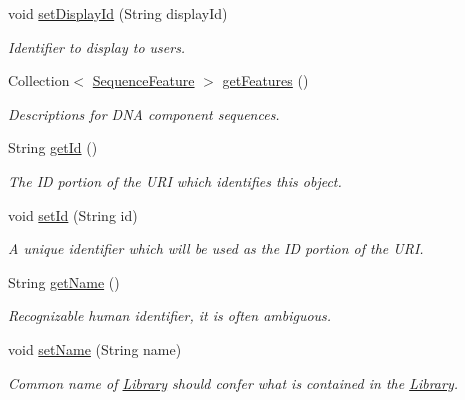 \begin{DoxyCompactItemize}
void \hyperlink{classorg_1_1sbolstandard_1_1lib_s_b_o_lj_1_1_library_a46b93a70e7bd612a7b429aac4829bc88}{setDisplayId} (String displayId)
\begin{DoxyCompactList}\small\item\em Identifier to display to users. \item\end{DoxyCompactList}\item 
Collection$<$ \hyperlink{classorg_1_1sbolstandard_1_1lib_s_b_o_lj_1_1_sequence_feature}{SequenceFeature} $>$ \hyperlink{classorg_1_1sbolstandard_1_1lib_s_b_o_lj_1_1_library_a6e4112a6cec45766efb5ce852f1e764e}{getFeatures} ()
\begin{DoxyCompactList}\small\item\em Descriptions for DNA component sequences. \item\end{DoxyCompactList}\item 
String \hyperlink{classorg_1_1sbolstandard_1_1lib_s_b_o_lj_1_1_library_aab219518f0eaf3db55b6a62ad6b49407}{getId} ()
\begin{DoxyCompactList}\small\item\em The ID portion of the URI which identifies this object. \item\end{DoxyCompactList}\item 
void \hyperlink{classorg_1_1sbolstandard_1_1lib_s_b_o_lj_1_1_library_a0baf110c74c46a69b4c7a93bb68001b4}{setId} (String id)
\begin{DoxyCompactList}\small\item\em A unique identifier which will be used as the ID portion of the URI. \item\end{DoxyCompactList}\item 
String \hyperlink{classorg_1_1sbolstandard_1_1lib_s_b_o_lj_1_1_library_a78ee178b6a73658d65ca60da4d1e6683}{getName} ()
\begin{DoxyCompactList}\small\item\em Recognizable human identifier, it is often ambiguous. \item\end{DoxyCompactList}\item 
void \hyperlink{classorg_1_1sbolstandard_1_1lib_s_b_o_lj_1_1_library_ad737b36b74be994e0d8420797ed72f78}{setName} (String name)
\begin{DoxyCompactList}\small\item\em Common name of \hyperlink{classorg_1_1sbolstandard_1_1lib_s_b_o_lj_1_1_library}{Library} should confer what is contained in the \hyperlink{classorg_1_1sbolstandard_1_1lib_s_b_o_lj_1_1_library}{Library}. \item\end{DoxyCompactList}\item 

\end{DoxyCompactItemize}
